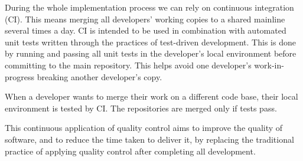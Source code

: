 \documentclass[../../main.tex]{subfiles}
\begin{document}
During the whole implementation process we can rely on continuous integration (CI). 
This means merging all developers' working copies to a shared mainline several times a day. 
CI is intended to be used in combination with automated unit tests written through the practices of test-driven development. 
This is done by running and passing all unit tests in the developer's local environment before committing to the main repository. 
This helps avoid one developer's work-in-progress breaking another developer's copy. 

When a developer wants to merge their work on a different code base, their local environment is tested by CI. 
The repositories are merged only if tests pass. 

This continuous application of quality control aims to improve the quality of software, and to reduce the time taken to deliver it, by replacing the traditional practice of applying quality control after completing all development.
\end{document}
